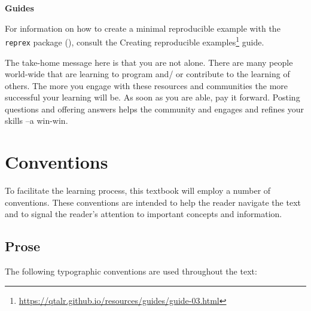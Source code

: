 \documentclass[
  letterpaper,
]{latex/krantz}
\theoremstyle{definition}
\theoremstyle{remark}
\DeclareRobustCommand{\href}[2]{#2\footnote{\url{#1}}}
\begin{document}
\begin{tcolorbox}[enhanced jigsaw, breakable, leftrule=.75mm, arc=.35mm, colframe=quarto-callout-color-frame, colback=white, left=2mm, bottomrule=.15mm, rightrule=.15mm, toprule=.15mm, opacityback=0]

\textbf{ Guides}

For information on how to create a minimal reproducible example with the
\texttt{reprex} package (),
consult the
\href{https://qtalr.github.io/resources/guides/guide-03.html}{Creating
reproducible examples} guide.

\end{tcolorbox}

The take-home message here is that you are not alone. There are many
people world-wide that are learning to program and/ or contribute to the
learning of others. The more you engage with these resources and
communities the more successful your learning will be. As soon as you
are able, pay it forward. Posting questions and offering answers helps
the community and engages and refines your skills --a win-win.

\section*{Conventions}\label{sec-p-conventions}


To facilitate the learning process, this textbook will employ a number
of conventions. These conventions are intended to help the reader
navigate the text and to signal the reader's attention to important
concepts and information.

\subsection*{Prose}\label{sec-p-prose}

The following typographic conventions are used throughout the text:
\end{document}
